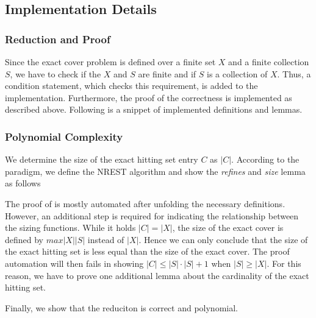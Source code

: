 \subsection{Implementation Details}
\subsubsection*{Reduction and Proof}
Since the exact cover problem is defined over a finite set $X$ and a finite collection $S$, we have to check if the $X$ and $S$ are finite and 
if $S$ is a collection of $X$. Thus, a condition statement, which checks this requirement, is added to the implementation. Furthermore,
the proof of the correctness is implemented as described above. Following is a snippet of implemented definitions and lemmas.

\subsubsection*{Polynomial Complexity}
We determine the size of the exact hitting set entry $C$ as $|C|$. According to the paradigm, 
we define the NREST algorithm and show the \textit{refines} and \textit{size} lemma as follows


The proof of is mostly automated after unfolding the necessary definitions. 
However, an additional step is required for indicating the relationship between the sizing functions. 
While it holds $|C| = |X|$, 
the size of the exact cover is defined by $max |X| |S|$ instead of $|X|$. Hence we can
only conclude that the size of the exact hitting set is less equal than the size of the exact cover. 
The proof automation will then fails in showing $|C| \leq |S| \cdot |S| + 1$ when $|S| \geq |X|$. 
For this reason, we have to prove one additional lemma about the cardinality of the 
exact hitting set.


Finally, we show that the reduciton is correct and polynomial. 






